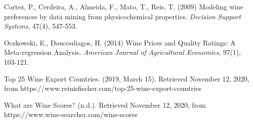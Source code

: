 \documentclass{article}
\begin{document}
\newpage
\begin{thebibliography}{9}
Cortez, P., Cerdeira, A., Almeida, F., Mato, T., Reis, T. (2009) Modeling wine preferences by data mining from physicochemical properties. 
\textit{Decision Support Systems}, 47(4), 547-553.

Oczkowski, E., Doucouliagos, H. (2014) Wine Prices and Quality Ratings: A Meta‐regression Analysis.
\textit{American Journal of Agricultural Economics}, 97(1), 103-121.

Top 25 Wine Export Countries. (2019, March 15). Retrieved November 12, 2020, from https://www.reinisfischer.com/top-25-wine-export-countries

What are Wine Scores? (n.d.). Retrieved November 12, 2020, from https://www.wine-searcher.com/wine-scores


\end{thebibliography}
\end{document}
